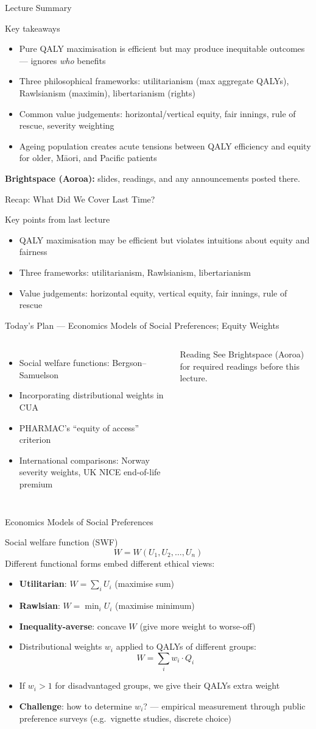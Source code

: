 \documentclass[aspectratio=169, 12pt]{beamer}
\newcommand{\recapslide}[1]{%
  \begin{frame}{Recap: What Did We Cover Last Time?}
    \begin{block}{Key points from last lecture}
      \begin{itemize}#1\end{itemize}
    \end{block}
  \end{frame}}
\newcommand{\planslide}[2]{%
  \begin{frame}{Today's Plan — #1}
    \begin{columns}
      \column{0.6\textwidth}
      \begin{itemize}#2\end{itemize}
      \column{0.38\textwidth}
      \begin{alertblock}{Reading}
        \footnotesize See Brightspace (Aoroa) for required readings before this lecture.
      \end{alertblock}
    \end{columns}
  \end{frame}}
\newcommand{\summaryside}[1]{%
  \begin{frame}{Lecture Summary}
    \begin{exampleblock}{Key takeaways}
      \begin{itemize}#1\end{itemize}
    \end{exampleblock}
    \vspace{0.5em}
    {\footnotesize\textcolor{OtagoGold}{\textbf{Brightspace (Aoroa):}} slides, readings, and any announcements posted there.}
  \end{frame}}
\begin{document}
\summaryside{
  \item Pure QALY maximisation is efficient but may produce inequitable outcomes --- ignores \emph{who} benefits
  \item Three philosophical frameworks: utilitarianism (max aggregate QALYs), Rawlsianism (maximin), libertarianism (rights)
  \item Common value judgements: horizontal/vertical equity, fair innings, rule of rescue, severity weighting
  \item Ageing population creates acute tensions between QALY efficiency and equity for older, Māori, and Pacific patients
}

\recapslide{
  \item QALY maximisation may be efficient but violates intuitions about equity and fairness
  \item Three frameworks: utilitarianism, Rawlsianism, libertarianism
  \item Value judgements: horizontal equity, vertical equity, fair innings, rule of rescue
}

\planslide{Economics Models of Social Preferences; Equity Weights}{
  \item Social welfare functions: Bergson--Samuelson
  \item Incorporating distributional weights in CUA
  \item PHARMAC's ``equity of access'' criterion
  \item International comparisons: Norway severity weights, UK NICE end-of-life premium
}

\begin{frame}{Economics Models of Social Preferences}
  \begin{block}{Social welfare function (SWF)}
    $$W = W(U_1, U_2, \ldots, U_n)$$
    Different functional forms embed different ethical views:
    \begin{itemize}
      \item \textbf{Utilitarian}: $W = \sum_i U_i$ (maximise sum)
      \item \textbf{Rawlsian}: $W = \min_i U_i$ (maximise minimum)
      \item \textbf{Inequality-averse}: concave $W$ (give more weight to worse-off)
    \end{itemize}
  \end{block}
  \vspace{0.3em}
  \begin{itemize}
    \item Distributional weights $w_i$ applied to QALYs of different groups:
          $$W = \sum_i w_i \cdot Q_i$$
    \item If $w_i > 1$ for disadvantaged groups, we give their QALYs extra weight
    \item \textbf{Challenge}: how to determine $w_i$? --- empirical measurement through
          public preference surveys (e.g.\ vignette studies, discrete choice)
  \end{itemize}
\end{frame}
\end{document}

